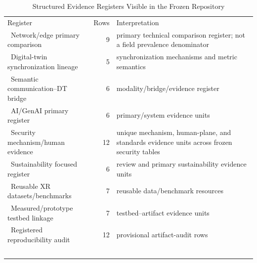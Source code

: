 \begin{table}[H]\centering\caption{Structured Evidence Registers Visible in the Frozen Repository}\label{tab:registercounts}\scriptsize\begin{tabularx}{\columnwidth}{p{}rY}\toprule Register & Rows & Interpretation \\\ \midrule Network/edge primary comparison & 9 & primary technical comparison register; not a field prevalence denominator \\\ Digital-twin synchronization lineage & 5 & synchronization mechanisms and metric semantics \\\ Semantic communication--DT bridge & 6 & modality/bridge/evidence register \\\ AI/GenAI primary register & 6 & primary/system evidence units \\\ Security mechanism/human evidence & 12 & unique mechanism, human-plane, and standards evidence units across frozen security tables \\\ Sustainability focused register & 6 & review and primary sustainability evidence units \\\ Reusable XR datasets/benchmarks & 7 & reusable data/benchmark resources \\\ Measured/prototype testbed linkage & 7 & testbed--artifact evidence units \\\ Registered reproducibility audit & 12 & provisional artifact-audit rows \\\ \bottomrule\end{tabularx}\end{table}
